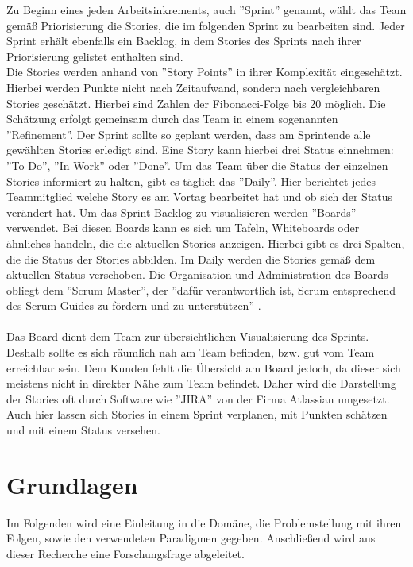 \documentclass[12pt,titlepage]{scrartcl}
\begin{document}
		Zu Beginn eines jeden Arbeitsinkrements, auch ''Sprint'' genannt, wählt das Team gemäß Priorisierung die Stories, die im folgenden Sprint zu bearbeiten sind. Jeder Sprint erhält ebenfalls ein Backlog, in dem Stories des Sprints nach ihrer Priorisierung gelistet enthalten sind. \\ 
		Die Stories werden anhand von ''Story Points'' in ihrer Komplexität eingeschätzt. Hierbei werden Punkte nicht nach Zeitaufwand, sondern nach vergleichbaren Stories geschätzt. Hierbei sind Zahlen der Fibonacci-Folge bis 20 möglich. Die Schätzung erfolgt gemeinsam durch das Team in einem sogenannten ''Refinement''. Der Sprint sollte so geplant werden, dass am Sprintende alle gewählten Stories erledigt sind. Eine Story kann hierbei drei Status einnehmen: ''To Do'', ''In Work'' oder ''Done''. Um das Team über die Status der einzelnen Stories informiert zu halten, gibt es täglich das ''Daily''. Hier berichtet jedes Teammitglied welche Story es am Vortag bearbeitet hat und ob sich der Status verändert hat. Um das Sprint Backlog zu visualisieren werden ''Boards'' verwendet. Bei diesen Boards kann es sich um Tafeln, Whiteboards oder ähnliches handeln, die die aktuellen Stories anzeigen. Hierbei gibt es drei Spalten, die die Status der Stories abbilden. Im Daily werden die Stories gemäß dem aktuellen Status verschoben. Die Organisation und Administration des Boards obliegt dem ''Scrum Master'', der ''dafür verantwortlich ist, Scrum entsprechend des Scrum Guides zu fördern	und zu unterstützen'' \cite{guide}. \\ \\
		Das Board dient dem Team zur übersichtlichen Visualisierung des Sprints. Deshalb sollte es sich räumlich nah am Team befinden, bzw. gut vom Team erreichbar sein. Dem Kunden fehlt die Übersicht am Board jedoch, da dieser sich meistens nicht in direkter Nähe zum Team befindet. Daher wird die Darstellung der Stories oft durch Software wie ''JIRA'' von der Firma Atlassian umgesetzt. Auch hier lassen sich Stories in einem Sprint verplanen, mit Punkten schätzen und mit einem Status versehen.
		\newpage
		\section{Grundlagen}
	Im Folgenden wird eine Einleitung in die Domäne, die Problemstellung mit ihren Folgen, sowie den verwendeten Paradigmen gegeben. Anschließend wird aus dieser Recherche eine Forschungsfrage abgeleitet.
\end{document}
